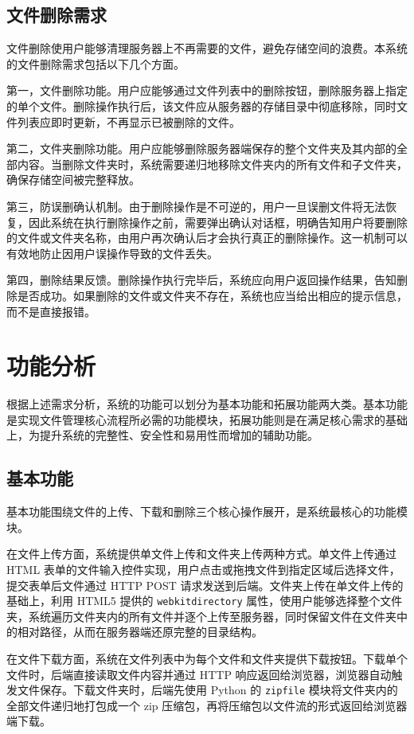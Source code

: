 \documentclass[UTF8,zihao=-4]{ctexrep}
\begin{document}
\subsection{文件删除需求}

文件删除使用户能够清理服务器上不再需要的文件，避免存储空间的浪费。本系统的文件删除需求包括以下几个方面。

第一，文件删除功能。用户应能够通过文件列表中的删除按钮，删除服务器上指定的单个文件。删除操作执行后，该文件应从服务器的存储目录中彻底移除，同时文件列表应即时更新，不再显示已被删除的文件。

第二，文件夹删除功能。用户应能够删除服务器端保存的整个文件夹及其内部的全部内容。当删除文件夹时，系统需要递归地移除文件夹内的所有文件和子文件夹，确保存储空间被完整释放。

第三，防误删确认机制。由于删除操作是不可逆的，用户一旦误删文件将无法恢复，因此系统在执行删除操作之前，需要弹出确认对话框，明确告知用户将要删除的文件或文件夹名称，由用户再次确认后才会执行真正的删除操作。这一机制可以有效地防止因用户误操作导致的文件丢失。

第四，删除结果反馈。删除操作执行完毕后，系统应向用户返回操作结果，告知删除是否成功。如果删除的文件或文件夹不存在，系统也应当给出相应的提示信息，而不是直接报错。

\section{功能分析}

根据上述需求分析，系统的功能可以划分为基本功能和拓展功能两大类。基本功能是实现文件管理核心流程所必需的功能模块，拓展功能则是在满足核心需求的基础上，为提升系统的完整性、安全性和易用性而增加的辅助功能。

\subsection{基本功能}

基本功能围绕文件的上传、下载和删除三个核心操作展开，是系统最核心的功能模块。

在文件上传方面，系统提供单文件上传和文件夹上传两种方式。单文件上传通过 HTML 表单的文件输入控件实现，用户点击或拖拽文件到指定区域后选择文件，提交表单后文件通过 HTTP POST 请求发送到后端。文件夹上传在单文件上传的基础上，利用 HTML5 提供的 \texttt{webkitdirectory} 属性，使用户能够选择整个文件夹，系统遍历文件夹内的所有文件并逐个上传至服务器，同时保留文件在文件夹中的相对路径，从而在服务器端还原完整的目录结构。

在文件下载方面，系统在文件列表中为每个文件和文件夹提供下载按钮。下载单个文件时，后端直接读取文件内容并通过 HTTP 响应返回给浏览器，浏览器自动触发文件保存。下载文件夹时，后端先使用 Python 的 \texttt{zipfile} 模块将文件夹内的全部文件递归地打包成一个 zip 压缩包，再将压缩包以文件流的形式返回给浏览器端下载。
\end{document}
